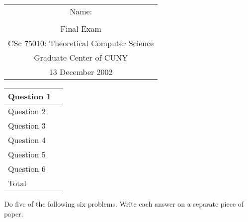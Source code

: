 \documentclass[11pt]{article}
\begin{document}
{\bf
\begin{tabular}{c}
	Name: \underline{\hspace{2.5in}}\\ \\
	{\large Final Exam}\\
        	CSc 75010: Theoretical Computer Science\\
        	Graduate Center of CUNY\\
	13 December 2002\\
\end{tabular}
}
\hfill
\begin{tabular}{|l|c|}
\hline
Question 1 & \mbox{\hspace{.5in}}\\
\hline        	
Question 2 & \\
\hline
Question 3 & \\
\hline
        	Question 4 & \\
\hline
        	Question 5 & \\
\hline
        	Question 6 & \\
\hline\hline
         Total & \\
\hline
\end{tabular}

Do five of the following six problems.  Write each answer on a separate
piece of paper.
\end{document}
